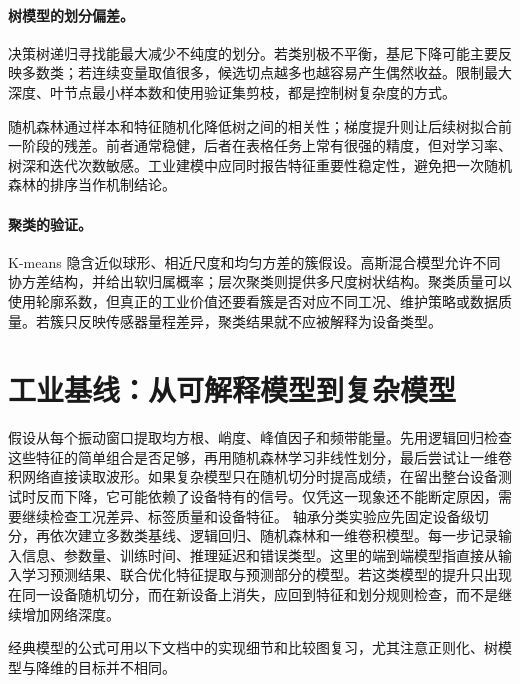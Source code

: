 \paragraph{树模型的划分偏差。}
决策树递归寻找能最大减少不纯度的划分。若类别极不平衡，基尼下降可能主要反映多数类；若连续变量取值很多，候选切点越多也越容易产生偶然收益。限制最大深度、叶节点最小样本数和使用验证集剪枝，都是控制树复杂度的方式。

随机森林通过样本和特征随机化降低树之间的相关性；梯度提升则让后续树拟合前一阶段的残差。前者通常稳健，后者在表格任务上常有很强的精度，但对学习率、树深和迭代次数敏感。工业建模中应同时报告特征重要性稳定性，避免把一次随机森林的排序当作机制结论。

\paragraph{聚类的验证。}
K-means 隐含近似球形、相近尺度和均匀方差的簇假设。高斯混合模型允许不同协方差结构，并给出软归属概率；层次聚类则提供多尺度树状结构。聚类质量可以使用轮廓系数，但真正的工业价值还要看簇是否对应不同工况、维护策略或数据质量。若簇只反映传感器量程差异，聚类结果就不应被解释为设备类型。

\section{工业基线：从可解释模型到复杂模型}
假设从每个振动窗口提取均方根、峭度、峰值因子和频带能量。先用逻辑回归检查这些特征的简单组合是否足够，再用随机森林学习非线性划分，最后尝试让一维卷积网络直接读取波形。如果复杂模型只在随机切分时提高成绩，在留出整台设备测试时反而下降，它可能依赖了设备特有的信号。仅凭这一现象还不能断定原因，需要继续检查工况差异、标签质量和设备特征。
轴承分类实验应先固定设备级切分，再依次建立多数类基线、逻辑回归、随机森林和一维卷积模型。每一步记录输入信息、参数量、训练时间、推理延迟和错误类型。这里的端到端模型指直接从输入学习预测结果、联合优化特征提取与预测部分的模型。若这类模型的提升只出现在同一设备随机切分，而在新设备上消失，应回到特征和划分规则检查，而不是继续增加网络深度。

经典模型的公式可用以下文档中的实现细节和比较图复习，尤其注意正则化、树模型与降维的目标并不相同。
